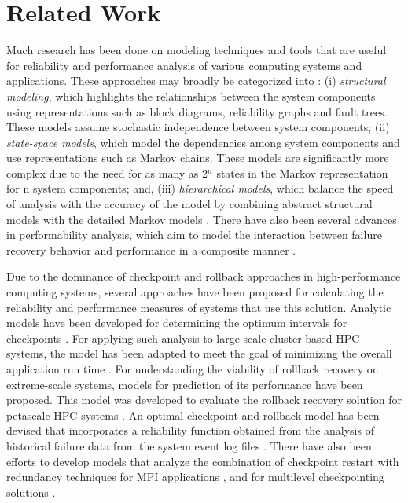\section{Related Work}
\label{sec:RelatedWork}

Much research has been done on modeling techniques and tools that are useful for reliability and performance analysis  of various computing systems and applications. These approaches may broadly be categorized into \cite{Pham:2006}: (i) \textit{structural modeling}, which highlights the relationships between the system components using representations such as block diagrams, reliability graphs and fault trees. These models assume stochastic independence between system components; (ii) \textit{state-space models}, which model the dependencies among system components and use representations such as Markov chains. These models are significantly more complex due to the need for as many as 2$^{n}$ states in the Markov representation for n system components; and, (iii) \textit{hierarchical models}, which balance the speed of analysis with the accuracy of the model by combining abstract structural models with the detailed Markov models \cite{Geist:1990}. There have also been several advances in performability analysis, which aim to model the interaction between failure recovery behavior and performance in a composite manner \cite{Beaudry:1978} \cite{Trivedi:1993}.  

Due to the dominance of checkpoint and rollback approaches in high-performance computing systems, several approaches have been proposed for calculating the reliability and performance measures of systems that use this solution.    
Analytic models have been developed for determining the optimum intervals for checkpoints \cite{Young:1974}. For applying such analysis to large-scale cluster-based HPC systems, the model has been adapted to meet the goal of minimizing the overall application run time \cite{Daly:2006}. For understanding the viability of rollback recovery on extreme-scale systems, models for prediction of its performance have been proposed. This model was developed to evaluate the rollback recovery solution for petascale HPC systems \cite{Elnozahy:2004}. An optimal checkpoint and rollback model has been devised that incorporates a reliability function obtained from the analysis of historical failure data from the system event log files \cite{Liu:2007}. There have also been efforts to develop models that analyze the combination of checkpoint restart with redundancy techniques for MPI applications \cite{Elliott:2012}, and for multilevel checkpointing solutions \cite{Di:2014}.
